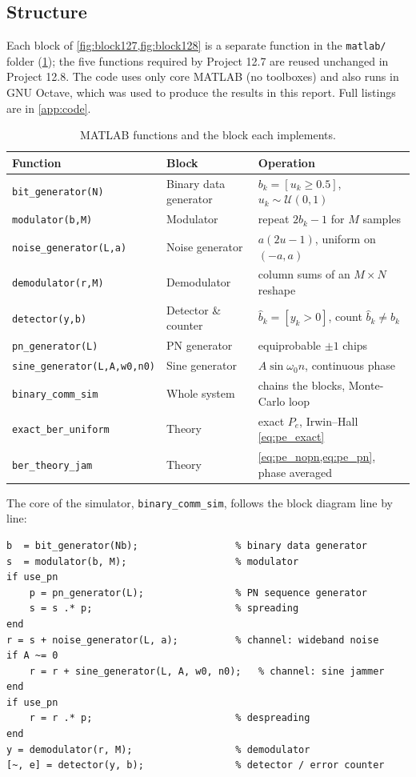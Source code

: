 \documentclass[11pt,a4paper]{article}
\begin{document}
\subsection{Structure}

Each block of \cref{fig:block127,fig:block128} is a separate function in the
\texttt{matlab/} folder (\cref{tab:functions}); the five functions required by
Project 12.7 are reused unchanged in Project 12.8. The code uses only core MATLAB
(no toolboxes) and also runs in GNU Octave, which was used to produce the
results in this report. Full listings are in \cref{app:code}.

\begin{table}[ht]
\centering
\caption{MATLAB functions and the block each implements.}
\label{tab:functions}
\begin{tabular}{@{}lll@{}}
\toprule
Function & Block & Operation \\
\midrule
\texttt{bit\_generator(N)}          & Binary data generator & $b_k = [u_k\ge0.5]$, $u_k\sim\mathcal{U}(0,1)$ \\
\texttt{modulator(b,M)}             & Modulator             & repeat $2b_k-1$ for $M$ samples \\
\texttt{noise\_generator(L,a)}      & Noise generator       & $a(2u-1)$, uniform on $(-a,a)$ \\
\texttt{demodulator(r,M)}           & Demodulator           & column sums of an $M\times N$ reshape \\
\texttt{detector(y,b)}              & Detector \& counter   & $\hat b_k=[y_k>0]$, count $\hat b_k\ne b_k$ \\
\texttt{pn\_generator(L)}           & PN generator          & equiprobable $\pm1$ chips \\
\texttt{sine\_generator(L,A,w0,n0)} & Sine generator        & $A\sin\omega_0 n$, continuous phase \\
\midrule
\texttt{binary\_comm\_sim}          & Whole system          & chains the blocks, Monte-Carlo loop \\
\texttt{exact\_ber\_uniform}        & Theory                & exact $P_e$, Irwin--Hall \eqref{eq:pe_exact} \\
\texttt{ber\_theory\_jam}           & Theory                & \cref{eq:pe_nopn,eq:pe_pn}, phase averaged \\
\bottomrule
\end{tabular}
\end{table}

The core of the simulator, \texttt{binary\_comm\_sim}, follows the block diagram
line by line:
\begin{lstlisting}[firstnumber=29]
b  = bit_generator(Nb);                 % binary data generator
s  = modulator(b, M);                   % modulator
if use_pn
    p = pn_generator(L);                % PN sequence generator
    s = s .* p;                         % spreading
end
r = s + noise_generator(L, a);          % channel: wideband noise
if A ~= 0
    r = r + sine_generator(L, A, w0, n0);   % channel: sine jammer
end
if use_pn
    r = r .* p;                         % despreading
end
y = demodulator(r, M);                  % demodulator
[~, e] = detector(y, b);                % detector / error counter
\end{lstlisting}
\end{document}
